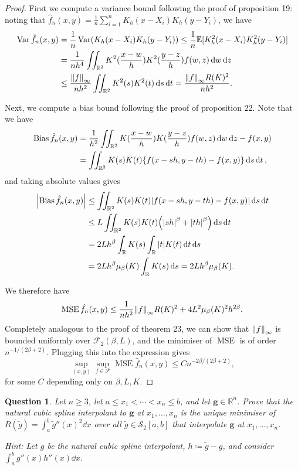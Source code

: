 \documentclass{article}
\theoremstyle{plain}
\newtheorem{question}{Question}
\theoremstyle{remark}
\renewcommand{\vec}{\boldsymbol}
\newcommand{\Bb}{\mathbb}
\newcommand{\Cal}{\mathcal}
\newcommand{\RR}{\Bb R}
\newcommand{\EE}{\Bb E}
\newcommand\FF{\Cal F}
\renewcommand\SS{\Cal S}
\newcommand\ceq\coloneqq %
\DeclareMathOperator{\Var}{Var}
\DeclareMathOperator\MSE{MSE}
\DeclareMathOperator\Bias{Bias}
\begin{document}
\begin{proof}
	First we compute a variance bound following the proof of proposition 19: noting that $\hat f_n(x, y) = \frac1n \sum_{i=1}^n K_h(x - X_i) K_h(y - Y_i)$, we have
	\begin{align*}
		\Var \hat f_n(x, y) &= \frac1n \Var(K_h(x - X_i) K_h(y - Y_i)) \leq \frac1n \EE[K_h^2(x - X_i) K_h^2(y - Y_i)] \\
		&= \frac1{nh^4}  \iint_{\RR^2} K^2(\frac{x-w}{h}) K^2(\frac{y - z}{h}) f(w, z) \dd{w} \dd{z} \\
		&\leq  \frac{\norm{f}_\infty}{nh^2} \iint_{\RR^2} K^2(s) K^2(t) \dd{s} \dd{t} = \frac{\norm{f}_\infty R(K)^2}{nh^2}.
	\end{align*}

	Next, we compute a bias bound following the proof of proposition 22. Note that we have
	\begin{align*}
		\Bias \hat f_n(x, y) &= \frac1{h^2} \iint_{\RR^2} K(\frac{x-w}{h}) K(\frac{y-z}{h}) f(w, z) \dd{w}\dd{z} - f(x, y) \\
		&= \iint_{\RR^2} K(s) K(t)\qty{f(x - sh, y - th) - f(x, y)} \dd{s} \dd{t}, 
	\end{align*}
	and taking absolute values gives
	\begin{align*}
		\abs{\Bias\hat f_n(x, y)} &\leq \iint_{\RR^2} {K(s)} {K(t)} \abs{f(x - sh, y - th) - f(x, y)} \dd{s} \dd{t} \\
		&\leq L \iint_{\RR^2} {K(s)} {K(t)} \qty(\abs{sh}^\beta + \abs{th}^\beta) \dd{s} \dd{t} \\
		&= 2Lh^\beta \int_\RR {K(s)} \int_\RR \abs{t} {K(t)} \dd{t} \dd{s} \\
		&= 2Lh^\beta \mu_\beta(K) \int_\RR {K(s)} \dd{s} = 2Lh^\beta \mu_\beta(K). 
	\end{align*}
	
	We therefore have
	\[
	\MSE \hat f_n(x, y) \leq \frac1{nh^2} \norm{f}_\infty R(K)^2 + 4L^2\mu_\beta(K)^2 h^{2\beta}. 
	\]
	Completely analogous to the proof of theorem 23, we can show that $\norm{f}_\infty$ is bounded uniformly over $\FF_2(\beta, L)$, and the minimiser of $\MSE$ is of order $n^{-1/(2\beta + 2)}$. Plugging this into the expression gives 
	\[
	\sup_{(x, y)} \sup_{f \in \FF} \MSE \hat f_n(x, y) \leq C n^{-2\beta/(2\beta + 2)},
	\]
	for some $C$ depending only on $\beta, L, K$. 
\end{proof}


\setcounter{question}{9}
\begin{question}
Let $n \geq 3$, let $a \leq x_1 < \dotsb < x_n \leq b$, and let $\vec g \in \RR^n$. Prove that the natural cubic spline interpolant to $\vec g$ at $x_1, \dotsc, x_n$ is the unique minimiser of $R(\tilde g) = \int_a^b \tilde g''(x)^2 \dd{x}$ over all $\tilde g \in \SS_2[a, b]$ that interpolate $\vec g$ at $x_1, \dotsc, x_n$. 

\emph{Hint:} Let $g$ be the natural cubic spline interpolant, $h \ceq \tilde g - g$, and consider $\int_a^b g''(x) h''(x) \dd{x}$. 
\end{question}
\end{document}
